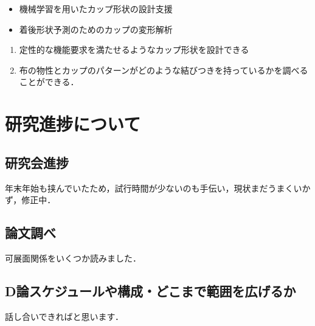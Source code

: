 \documentclass[11pt]{jsarticle}
\begin{document}
	\articleSPRabst
		\begin{itemize}
			\item 機械学習を用いたカップ形状の設計支援
			\item 着後形状予測のためのカップの変形解析
		\end{itemize}
		
		
	\articleSPRobj
		\begin{enumerate}
			\item 定性的な機能要求を満たせるようなカップ形状を設計できる
			\item 布の物性とカップのパターンがどのような結びつきを持っているかを調べることができる．
		\end{enumerate}
	\articleSPRitemsone
		
		\tableofcontents
		
		
	\articleSPRitemstwo
	\renewcommand{\labelitemi}{$\blacktriangledown$}
	\newcommand{\argmax}{\mathop{\rm arg~max}\limits}
	\newcommand{\argmin}{\mathop{\rm arg~min}\limits}
	\newcommand{\Ker}{{\rm Ker}}
	\newcommand{\rank}{{\rm rank}}
	\section{研究進捗について}
		\subsection{研究会進捗}
			年末年始も挟んでいたため，試行時間が少ないのも手伝い，現状まだうまくいかず，修正中．
	
		\subsection{論文調べ}
			可展面関係をいくつか読みました．
		\subsection{D論スケジュールや構成・どこまで範囲を広げるか}
			話し合いできればと思います．
\end{document}
